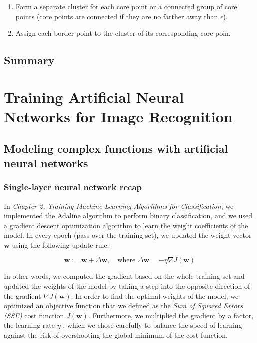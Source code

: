 \documentclass[letterpaper]{report}
\begin{document}
\begin{enumerate}
\item Form a separate cluster for each core point or a connected group of core points (core points are connected if they are no farther away than $\epsilon$).
\item Assign each border point to the cluster of its corresponding core poin.
\end{enumerate}

\section{Summary}






\chapter{Training Artificial Neural Networks for Image Recognition}

\section{Modeling complex functions with artificial neural networks}
\subsection{Single-layer neural network recap}

In \textit{Chapter 2, Training Machine Learning Algorithms for Classification}, we implemented the Adaline algorithm to perform binary classification, and we used a gradient descent optimization algorithm to learn the weight coefficients of the model. In every epoch (pass over the training set), we updated the weight vector $\mathbf{w}$ using the following update rule:

\[
\mathbf{w} := \mathbf{w} + \Delta \mathbf{w}, \quad \text{where } \Delta \mathbf{w} = - \eta \nabla J (\mathbf{w})
\]

In other words, we computed the gradient based on the whole training set and updated the weights of the model by taking a step into the opposite direction of the gradient $\nabla J(\mathbf{w})$. In order to find the optimal weights of the model, we optimized an objective function that we defined as the \textit{Sum of Squared Errors (SSE)} cost function $J(\mathbf{w})$. Furthermore, we multiplied the gradient by a factor, the learning rate $\eta$ , which we chose carefully to balance the speed of learning against the risk of overshooting the global minimum of the cost function.
\end{document}
